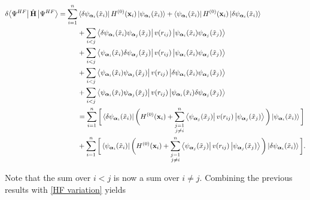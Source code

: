 \documentclass{homework}
\begin{document}
\begin{align*}
    \delta {\bra{\Psi^{HF}}\hat{\bf H}\ket{\Psi^{HF}}} = \sum_{i=1}^{n} & \bra{ \delta \psi_{\bm{\alpha}_{i}}(\tilde{x}_i)} {H}^{(0)}({\bf x}_i) \ket{\psi_{\bm{\alpha}_{i}}(\tilde{x}_i)} + \bra{  \psi_{\bm{\alpha}_{i}}(\tilde{x}_i)} {H}^{(0)}({\bf x}_i) \ket{\delta \psi_{\bm{\alpha}_{i}}(\tilde{x}_i)} \\
    &+ \sum_{i<j} \bra{\delta \psi_{\bm{\alpha}_{i}}(\tilde{x}_{i})\psi_{\bm{\alpha}_{j}}(\tilde{x}_{j})} v(r_{ij})\ket{\psi_{\bm{\alpha}_{i}}(\tilde{x}_{i})\psi_{\bm{\alpha}_{j}}(\tilde{x}_{j})} \\
    &+ \sum_{i<j} \bra{ \psi_{\bm{\alpha}_{i}}(\tilde{x}_{i})\delta \psi_{\bm{\alpha}_{j}}(\tilde{x}_{j})} v(r_{ij})\ket{\psi_{\bm{\alpha}_{i}}(\tilde{x}_{i})\psi_{\bm{\alpha}_{j}}(\tilde{x}_{j})} \\
    &+ \sum_{i<j} \bra{ \psi_{\bm{\alpha}_{i}}(\tilde{x}_{i}) \psi_{\bm{\alpha}_{j}}(\tilde{x}_{j})} v(r_{ij})\ket{\delta \psi_{\bm{\alpha}_{i}}(\tilde{x}_{i})\psi_{\bm{\alpha}_{j}}(\tilde{x}_{j})} \\
    &+\sum_{i<j} \bra{ \psi_{\bm{\alpha}_{i}}(\tilde{x}_{i}) \psi_{\bm{\alpha}_{j}}(\tilde{x}_{j})} v(r_{ij})\ket{ \psi_{\bm{\alpha}_{i}}(\tilde{x}_{i}) \delta\psi_{\bm{\alpha}_{j}}(\tilde{x}_{j})} \\
    &= \sum_{i=1}^{n} \bigg[ \bra{\delta \psi_{\bm{\alpha}_{i}}(\tilde{x}_{i})} \bigg( H^{(0)}({\bf x}_i) + \sum_{\substack{j = 1 \\
    j \neq i}}^{n} \bra{\psi_{\bm{\alpha}_{j}}(\tilde{x}_j)}
    v(r_{ij})
    \ket{\psi_{\bm{\alpha}_{j}}(\tilde{x}_j)} \bigg) \ket{\psi_{\bm{\alpha}_{i}}(\tilde{x}_{i})} \bigg] \\
    &  + \sum_{i=1}^{n} \bigg[ \bra{ \psi_{\bm{\alpha}_{i}}(\tilde{x}_{i})} \bigg( H^{(0)}({\bf x}_i) + \sum_{\substack{j = 1 \\
    j \neq i}}^{n} \bra{\psi_{\bm{\alpha}_{j}}(\tilde{x}_j)}
    v(r_{ij})
    \ket{\psi_{\bm{\alpha}_{j}}(\tilde{x}_j)} \bigg) \ket{ \delta \psi_{\bm{\alpha}_{i}}(\tilde{x}_{i})} \bigg].
\end{align*}

Note that the sum over $i < j$ is now a sum over $i \neq j$. Combining the previous results with \eqref{HF variation} yields
\end{document}
